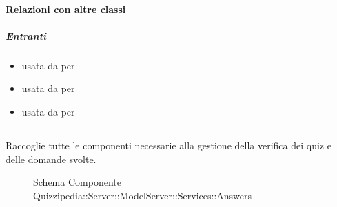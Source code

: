 \paragraph{Relazioni con altre classi}
\subparagraph{Entranti}
\begin{itemize}
\item usata da  per 
\item usata da  per 
\item usata da  per 
\end{itemize}
\subsection{}
Raccoglie tutte le componenti necessarie alla gestione della verifica dei quiz e delle domande svolte.
\begin{figure}[H]
\centering
\noindent{}
\caption[Schema Componente Quizzipedia::Server::ModelServer::Services::Answers]{Schema Componente Quizzipedia::Server::ModelServer::Services::Answers}
\end{figure}
